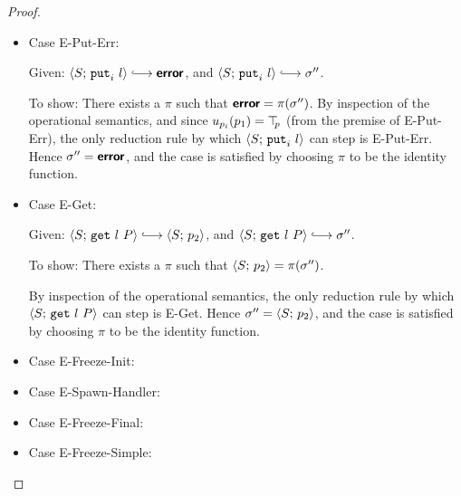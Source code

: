 \begin{proof}
\begin{itemize}
  \item Case {\sc E-Put-Err}:

    Given: $\config{S}{\putiexp{l}} \parstepsto \error$, and
    $\config{S}{\putiexp{l}} \parstepsto \conf''$.

    To show: There exists a $\pi$ such that $\textbf{\textsf{error}} = \pi(\sigma'')$.
    By inspection of the operational semantics, and since
    $u_{p_i}(p_1) = \top\hspace{-0.85mm}_{p}$ (from the premise of {\sc E-Put-Err}), the
    only reduction rule by which $\langle S;\, \mbox{\texttt{put}}_i~l \rangle$ can step is
    {\sc E-Put-Err}.  Hence $\sigma'' = \textbf{\textsf{error}}$, and the case is
    satisfied by choosing $\pi$ to be the identity function.

  \item Case {\sc E-Get}:

    Given: $\config{S}{\getexp{l}{P}} \parstepsto \config{S}{p_2}$,
    and $\config{S}{\getexp{l}{P}} \parstepsto \conf''$.

    To show: There exists a $\pi$ such that $\langle S;\, p_2 \rangle =
    \pi(\sigma'')$.

    By inspection of the operational semantics, the only reduction
    rule by which $\langle S;\, \mbox{\texttt{get}}~l~P \rangle$ can step is {\sc E-Get}.
    Hence $\sigma'' = \langle S;\, p_2 \rangle$, and the case is satisfied by
    choosing $\pi$ to be the identity function.

  \item Case {\sc E-Freeze-Init}:


  \item Case {\sc E-Spawn-Handler}:


  \item Case {\sc E-Freeze-Final}:


  \item Case {\sc E-Freeze-Simple}:


  \end{itemize}
\end{proof}

